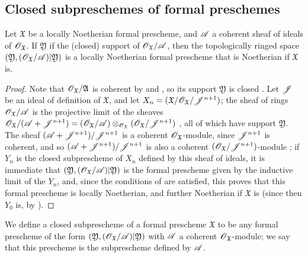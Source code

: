 \subsection{Closed subpreschemes of formal preschemes}
\label{subsection:1.10.14}

\begin{proposition}[10.14.1]
\label{1.10.14.1}
Let $\mathfrak{X}$ be a locally Noetherian formal prescheme, and $\mathscr{A}$ a coherent sheaf of ideals of $\mathscr{O}_\mathfrak{X}$.
If $\mathfrak{Y}$ if the (closed) support of $\mathscr{O}_\mathfrak{X}/\mathscr{A}$, then the topologically ringed space $(\mathfrak{Y},(\mathscr{O}_\mathfrak{X}/\mathscr{A})|\mathfrak{Y})$ is a locally Noetherian formal prescheme that is Noetherian if $\mathfrak{X}$ is.
\end{proposition}

\begin{proof}
\label{proof-1.10.14.1}
Note that $\mathscr{O}_\mathfrak{X}/\mathfrak{A}$ is coherent by  and , so its support $\mathfrak{Y}$ is closed .
Let $\mathscr{J}$ be an ideal of definition of $\mathfrak{X}$, and let $X_n=(\mathfrak{X}/\mathscr{O}_\mathfrak{X}/\mathscr{J}^{n+1})$;
the sheaf of rings $\mathscr{O}_\mathfrak{X}/\mathscr{A}$ is the projective limit of the sheaves $\mathscr{O}_\mathfrak{X}/(\mathscr{A}+\mathscr{J}^{n+1})=(\mathscr{O}_\mathfrak{X}/\mathscr{A})\otimes_{\mathscr{O}_\mathfrak{X}}(\mathscr{O}_\mathfrak{X}/\mathscr{J}^{n+1})$ , all of which have support $\mathfrak{Y}$.
The sheaf $(\mathscr{A}+\mathscr{J}^{n+1})/\mathscr{J}^{n+1}$ is a coherent $\mathscr{O}_\mathfrak{X}$-module, since $\mathscr{J}^{n+1}$ is coherent, and so $(\mathscr{A}+\mathscr{J}^{n+1})/\mathscr{J}^{n+1}$ is also a coherent $(\mathscr{O}_\mathfrak{X}/\mathscr{J}^{n+1})$-module ;
if $Y_n$ is the closed subprescheme of $X_n$ defined by this sheaf of ideals, it is immediate that $(\mathfrak{Y},(\mathscr{O}_\mathfrak{X}/\mathscr{A})|\mathfrak{Y})$
is the formal prescheme given by the inductive limit of the $Y_n$, and, since the conditions of  are satisfied, this proves that this formal prescheme is locally Noetherian, and further Noetherian if $\mathfrak{X}$ is (since then $Y_0$ is, by ).
\end{proof}

\begin{definition}[10.14.2]
\label{1.10.14.2}
We define a closed subprescheme of a formal prescheme $\mathfrak{X}$ to be any formal prescheme of the form $(\mathfrak{Y},(\mathscr{O}_\mathfrak{X}/\mathscr{A})|\mathfrak{Y})$ with $\mathscr{A}$ a coherent $\mathscr{O}_\mathfrak{X}$-module;
we say that this prescheme is the subprescheme defined by $\mathscr{A}$.
\end{definition}

